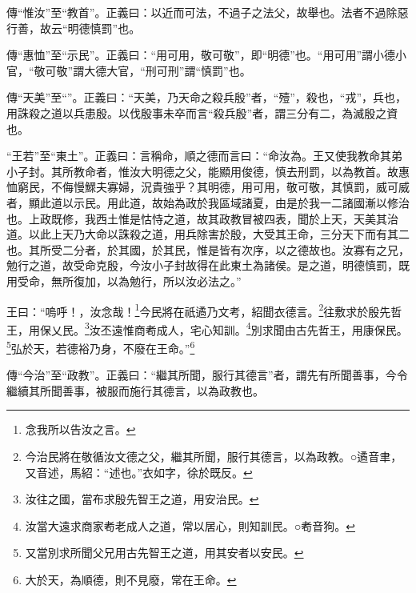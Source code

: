 {\noindent\zhuan{}\fzbyks 傳“惟汝”至“教首”。正義曰：以近而可法，不過子之法父，故舉也。法者不過除惡行善，故云“明德慎罰”也。 \par}

{\noindent\zhuan{}\fzbyks 傳“惠恤”至“示民”。正義曰：“用可用，敬可敬”，即“明德”也。“用可用”謂小德小官，“敬可敬”謂大德大官，“刑可刑”謂“慎罰”也。 \par}

{\noindent\zhuan{}\fzbyks 傳“天美”至“”。正義曰：“天美，乃天命之殺兵殷”者，“殪”，殺也，“戎”，兵也，用誅殺之道以兵患殷。以伐殷事未卒而言“殺兵殷”者，謂三分有二，為滅殷之資也。 \par}

{\noindent\shu{}\fzkt “王若”至“東土”。正義曰：言稱命，順之德而言曰：“命汝為。王又使我教命其弟小子封。其所教命者，惟汝大明德之父，能顯用俊德，慎去刑罰，以為教首。故惠恤窮民，不侮慢鰥夫寡婦，況貴強乎？其明德，用可用，敬可敬，其慎罰，威可威者，顯此道以示民。用此道，故始為政於我區域諸夏，由是於我一二諸國漸以修治也。上政既修，我西土惟是怙恃之道，故其政教冒被四表，聞於上天，天美其治道。以此上天乃大命以誅殺之道，用兵除害於殷，大受其王命，三分天下而有其二也。其所受二分者，於其國，於其民，惟是皆有次序，以之德故也。汝寡有之兄，勉行之道，故受命克殷，今汝小子封故得在此東土為諸侯。是之道，明德慎罰，既用受命，無所復加，以為勉行，所以汝必法之。” \par}

王曰：“嗚呼！，汝念哉！\footnote{念我所以告汝之言。}今民將在祇遹乃文考，紹聞衣德言。\footnote{今治民將在敬循汝文德之父，繼其所聞，服行其德言，以為政教。○遹音聿，又音述，馬紹：“述也。”衣如字，徐於既反。}往敷求於殷先哲王，用保乂民。\footnote{汝往之國，當布求殷先智王之道，用安治民。}汝丕遠惟商耇成人，宅心知訓。\footnote{汝當大遠求商家耇老成人之道，常以居心，則知訓民。○耇音狗。}別求聞由古先哲王，用康保民。\footnote{又當別求所聞父兄用古先智王之道，用其安者以安民。}弘於天，若德裕乃身，不廢在王命。”\footnote{大於天，為順德，則不見廢，常在王命。}


{\noindent\zhuan{}\fzbyks 傳“今治”至“政教”。正義曰：“繼其所聞，服行其德言”者，謂先有所聞善事，今令繼續其所聞善事，被服而施行其德言，以為政教也。 \par}

